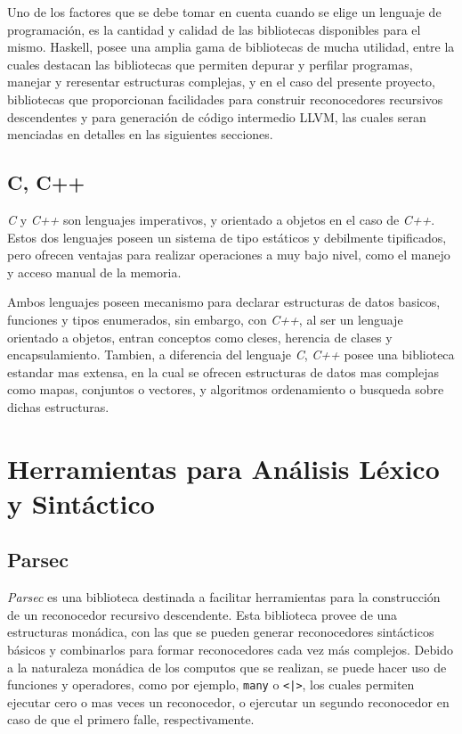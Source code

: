 Uno de los factores que se debe tomar en cuenta cuando se elige un lenguaje de
programación, es la cantidad y calidad de las bibliotecas disponibles para el
mismo. Haskell, posee una amplia gama de bibliotecas de mucha utilidad, entre la
cuales destacan las bibliotecas que permiten depurar y perfilar programas,
manejar y reresentar estructuras complejas, y en el caso del presente
proyecto, bibliotecas que proporcionan facilidades para construir reconocedores
recursivos descendentes y para generación de código intermedio LLVM, las
cuales seran menciadas en detalles en las siguientes secciones.


\subsection{C, C++}
\textit{C} y \textit{C++} son lenguajes imperativos, y orientado a objetos en
el caso de \textit{C++}. Estos dos lenguajes poseen un sistema de tipo
estáticos y debilmente tipificados, pero ofrecen ventajas para realizar
operaciones a muy bajo nivel, como el manejo y acceso manual de la memoria.

Ambos lenguajes poseen mecanismo para declarar estructuras de datos basicos,
funciones y tipos enumerados, sin embargo, con \textit{C++}, al ser un
lenguaje orientado a objetos, entran conceptos como cleses, herencia de clases
y encapsulamiento. Tambien, a diferencia del lenguaje \textit{C}, \textit{C++}
posee una biblioteca estandar mas extensa, en la cual se ofrecen estructuras
de datos mas complejas como mapas, conjuntos o vectores, y algoritmos
ordenamiento o busqueda sobre dichas estructuras.


\section{Herramientas para Análisis Léxico y Sintáctico}

\subsection{Parsec}
\textit{Parsec} es una biblioteca destinada a facilitar herramientas para la
construcción de un reconocedor recursivo descendente. Esta biblioteca provee
de una estructuras monádica, con las que se pueden generar reconocedores
sintácticos básicos y combinarlos para formar reconocedores cada vez más
complejos. Debido a la naturaleza monádica de los computos que se realizan, se
puede hacer uso de funciones y operadores, como por ejemplo, \texttt{many} o
\texttt{<|>}, los cuales permiten ejecutar cero o mas veces un reconocedor, o
ejercutar un segundo reconocedor en caso de que el primero falle,
respectivamente.

